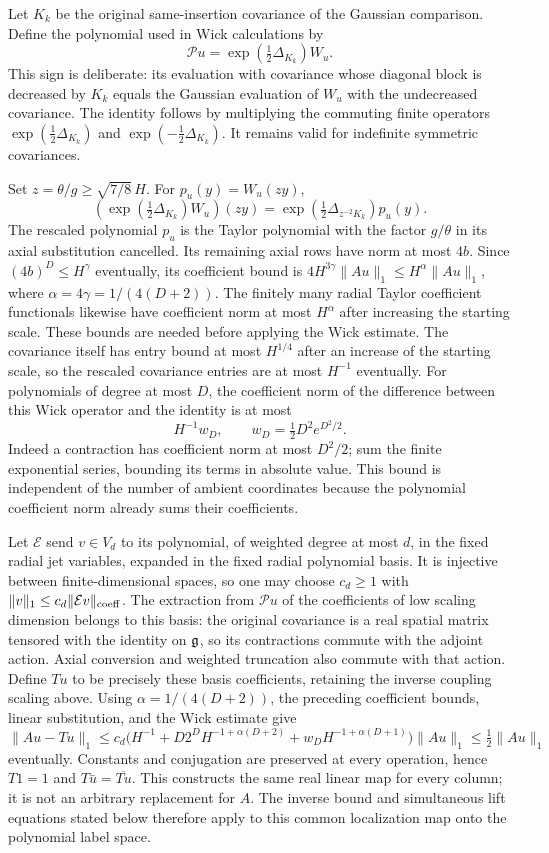 Let $K_k$ be the original same-insertion covariance of the
Gaussian comparison. Define the polynomial used in Wick calculations by
\[
 \mathscr P u=\exp\!\left(\tfrac12\Delta_{K_k}\right)W_u.
\]
This sign is deliberate: its evaluation with covariance whose
diagonal block is decreased by $K_k$ equals the Gaussian
evaluation of $W_u$ with the undecreased covariance.
The identity follows by multiplying the commuting finite
operators $\exp(\tfrac12\Delta_{K_k})$ and
$\exp(-\tfrac12\Delta_{K_k})$.
It remains valid for indefinite symmetric covariances.

Set $z=\theta/g\ge\sqrt{7/8}\,H$.
For $p_u(y)=W_u(zy)$,
\[
 (\exp(\tfrac12\Delta_{K_k})W_u)(zy)
   =\exp(\tfrac12\Delta_{z^{-2}K_k})p_u(y).
\]
The rescaled polynomial $p_u$ is the Taylor polynomial with
the factor $g/\theta$ in its axial substitution cancelled.
Its remaining axial rows have norm at most $4b$.
Since $(4b)^D\le H^\gamma$ eventually, its coefficient bound is
$4H^{3\gamma}\|Au\|_1\le H^\alpha\|Au\|_1$,
where $\alpha=4\gamma=1/(4(D+2))$.
The finitely many radial Taylor coefficient functionals likewise have coefficient
norm at most $H^\alpha$ after increasing the starting scale.
These bounds are needed before applying the Wick estimate.
The covariance itself has entry bound at most $H^{1/4}$ after
an increase of the starting scale, so the rescaled covariance entries are at most
$H^{-1}$ eventually.
For polynomials of degree at most $D$, the coefficient norm of
the difference between this Wick operator and the identity
is at most
\[
 H^{-1}w_D,\qquad
 w_D=\tfrac12D^2e^{D^2/2}.
\]
Indeed a contraction has coefficient norm at most $D^2/2$;
sum the finite exponential series, bounding its terms in absolute
value. This bound is independent of the number of ambient
coordinates because the polynomial coefficient norm already
sums their coefficients.

Let $\mathcal E$ send $v\in V_d$ to its polynomial, of weighted degree at most $d$, in the fixed radial jet variables, expanded in the fixed radial polynomial basis.
It is injective between finite-dimensional spaces, so one may choose $c_d\ge1$ with
$\|v\|_1\le c_d\|\mathcal Ev\|_{\rm coeff}$.
The extraction from $\mathscr Pu$ of the coefficients of low scaling dimension belongs to this basis:
the original covariance is a real spatial matrix tensored with
the identity on $\mathfrak g$, so its contractions commute with the
adjoint action. Axial conversion and weighted truncation
also commute with that action. Define $Tu$ to be precisely
these basis coefficients, retaining the inverse coupling scaling above.
Using $\alpha=1/(4(D+2))$, the preceding coefficient bounds,
linear substitution, and the Wick estimate give
\[
 \|Au-Tu\|_1
 \le c_d\bigl(H^{-1}+D2^DH^{-1+\alpha(D+2)}
                  +w_DH^{-1+\alpha(D+1)}\bigr)\|Au\|_1
 \le\tfrac12\|Au\|_1
\]
eventually. Constants and conjugation are preserved at every
operation, hence $T1=1$ and $T\bar u=\overline{Tu}$.
This constructs the same real linear map for every column;
it is not an arbitrary replacement for $A$.
The inverse bound and simultaneous lift equations stated below
therefore apply to this common localization map onto the polynomial label space.


